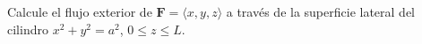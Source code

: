 Calcule el flujo exterior de $\mathbf F=\langle x,y,z\rangle$ a través de la superficie lateral del cilindro $x^2+y^2=a^2$, $0\leq z\leq L$.
